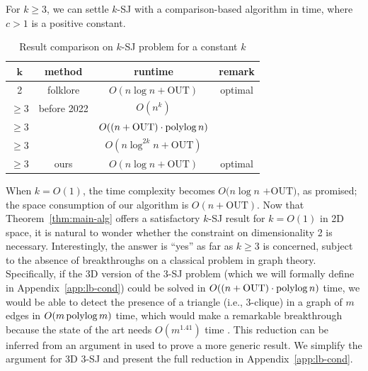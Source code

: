\documentclass[acmsmall,review,anonymous]{acmart}
\def\figcapup{\vspace{-2mm}}
\def\figcapdown{\vspace{-3mm}}
\def\out{\mathrm{OUT}}
\begin{document}
\begin{theorem} \label{thm:main-alg}
    For $k \ge 3$, we can settle $k$-SJ with a comparison-based algorithm in
    \myeqn{
        O( c^k \cdot (k!)^3 \cdot (n \log n + k \cdot \out))
        \nn
    }
    time, where $c > 1$ is a positive constant.
\end{theorem}


\begin{table}
    \begin{tabular}{c|c|c|c}
        $\bm{k}$ & {\bf method} & {\bf runtime} & {\bf remark} \\
        \hline\hline
        2 & folklore & $O(n \log n + \out)$ & optimal \\
        \hline
        $\ge 3$ & before 2022 & $O(n^k)$ &  \\
        $\ge 3$ & \cite{ty22} & $O((n + \out) \cdot \polylog n)$ & \\
        $\ge 3$ & \cite{kcko22} & $O(n \log^{2k} n + \out)$ & \\
        \hline
        $\ge 3$ & ours & $O(n \log n + \out)$ & optimal
    \end{tabular}

    \vspace{4mm}
    \figcapup
    \caption{Result comparison on $k$-SJ problem for a constant $k$}
    \label{tab:results-com}
    \figcapdown \vspace{-3mm}
\end{table}

When $k = O(1)$, the time complexity becomes $O(n \log n$ $+ \out)$, as promised; the space consumption of our algorithm is $O(n + \out)$. Now that Theorem~\ref{thm:main-alg} offers a satisfactory $k$-SJ result for $k = O(1)$ in 2D space, it is natural to wonder whether the constraint on dimensionality 2 is necessary. Interestingly, the answer is ``yes'' as far as $k \ge 3$ is concerned, subject to the absence of breakthroughs on a classical problem in graph theory. Specifically, if the 3D version of the 3-SJ problem (which we will formally define in Appendix~\ref{app:lb-cond}) could be solved in $O((n + \out) \cdot \polylog n)$ time, we would be able to detect the presence of a triangle (i.e., 3-clique) in a graph of $m$ edges in $O(m \operatorname*{polylog} m)$ time, which would make a remarkable breakthrough because the state of the art needs $O(m^{1.41})$ time \cite{ayz97}. This reduction can be inferred from an argument in \cite{kcko22} used to prove a more generic result. We simplify the argument for 3D 3-SJ and present the full reduction in Appendix~\ref{app:lb-cond}.
\end{document}
